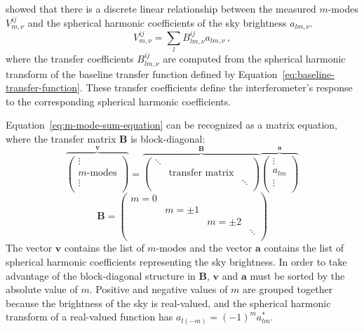 \documentclass[twocolumn]{aastex61}
\renewcommand{\b}{\pmb}
\begin{document}
\citet{2014ApJ...781...57S, 2015PhRvD..91h3514S} showed that there is a discrete linear relationship
between the measured $m$-modes $V^{ij}_{m,\nu}$ and the spherical harmonic coefficients of the sky
brightness $a_{lm,\nu}$.
\begin{equation}\label{eq:m-mode-sum-equation}
    V^{ij}_{m,\nu} = \sum_l B^{ij}_{lm,\nu} a_{lm,\nu}\,,
\end{equation}
where the transfer coefficients $B^{ij}_{lm,\nu}$ are computed from the spherical harmonic transform
of the baseline transfer function defined by Equation~\ref{eq:baseline-transfer-function}. These
transfer coefficients define the interferometer's response to the corresponding spherical harmonic
coefficients.

Equation~\ref{eq:m-mode-sum-equation} can be recognized as a matrix equation, where the transfer
matrix $\b B$ is block-diagonal:
\begin{equation}\label{eq:m-mode-matrix-equation}
    \overbrace{\left(
        \begin{array}{c}
            \vdots \\
            m\text{-modes} \\
            \vdots \\
        \end{array}
    \right)}^{\b v}
    =
    \overbrace{\left(
        \begin{array}{ccc}
            \ddots & & \\
            & \text{transfer matrix} & \\
            & & \ddots \\
        \end{array}
    \right)}^{\b B}
    \overbrace{\left(
        \begin{array}{c}
            \vdots \\
            a_{lm} \\
            \vdots \\
        \end{array}
    \right)}^{\b a}
\end{equation}
\begin{equation}
    \b B = \left(\begin{array}{cccc}
        m = 0 &&& \\
              & m=\pm1 && \\
              && m=\pm2 & \\
              &&& \ddots \\
    \end{array}\right)
\end{equation}
The vector $\b v$ contains the list of $m$-modes and the vector $\b a$ contains the list of
spherical harmonic coefficients representing the sky brightness. In order to take advantage of the
block-diagonal structure in $\b B$, $\b v$ and $\b a$ must be sorted by the absolute value of $m$.
Positive and negative values of $m$ are grouped together because the brightness of the sky is
real-valued, and the spherical harmonic transform of a real-valued function has $a_{l(-m)} = (-1)^m
a_{lm}^*$.
\end{document}
